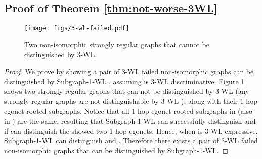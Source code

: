 \subsection{Proof of Theorem \ref{thm:not-worse-3WL}}\label{apdx:proof-3WL}
\begin{figure}[h]
    \centering
    \texttt{[image: figs/3-wl-failed.pdf]}
    \caption{Two non-isomorphic strongly regular graphs that cannot be distinguished by 3-WL. }
    \label{fig:3-wl-failed}
\end{figure}
\begin{proof}
We prove by showing a pair of 3-WL failed non-isomorphic graphs can be distinguished by Subgraph-1-WL , assuming  is 3-WL discriminative. Figure \ref{fig:3-wl-failed} shows two strongly regular graphs that can not be distinguished by 3-WL (any strongly regular graphs are not distinguishable by 3-WL \citep{arvind2020weisfeiler}), along with their 1-hop egonet rooted subgraphs. 
Notice that all 1-hop egonet rooted subgraphs in  (also in ) are the same, resulting that Subgraph-1-WL can successfully distinguish  and  if  can distinguish the showed two 1-hop egonets. 
Hence, when  is 3-WL expressive, Subgraph-1-WL can distinguish  and . Therefore there exists a pair of 3-WL failed non-isomorphic graphs that can be distinguished by Subgraph-1-WL. 
\end{proof}

